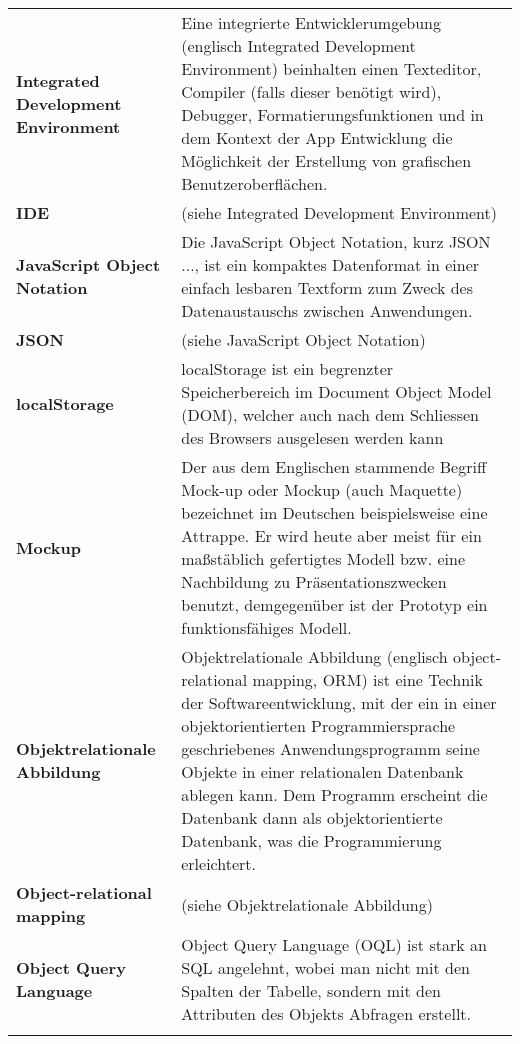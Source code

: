 \begin{longtable}{>{\raggedright}m{3cm}m{11cm}}
	\textbf{Integrated Development Environment}&
	Eine integrierte Entwicklerumgebung (englisch Integrated Development Environment) beinhalten einen Texteditor, Compiler (falls dieser benötigt wird), Debugger, Formatierungsfunktionen und in dem Kontext der App Entwicklung die Möglichkeit der Erstellung von grafischen Benutzeroberflächen.\\ \addlinespace

	\textbf{IDE}&
	(siehe Integrated Development Environment)\\ \addlinespace

	\textbf{JavaScript Object Notation}&
	Die JavaScript Object Notation, kurz JSON ..., ist ein kompaktes Datenformat in einer einfach lesbaren Textform zum Zweck des Datenaustauschs zwischen Anwendungen.\cite{wiki_json}\\ \addlinespace

	\textbf{JSON}&
	(siehe JavaScript Object Notation)\\ \addlinespace

	\textbf{localStorage}&
	localStorage ist ein begrenzter Speicherbereich im Document Object Model (DOM), welcher auch nach dem Schliessen des Browsers ausgelesen werden kann\\ \addlinespace	

	\textbf{Mockup}&
	Der aus dem Englischen stammende Begriff Mock-up oder Mockup (auch Maquette) bezeichnet im Deutschen beispielsweise eine Attrappe. Er wird heute aber meist für ein maßstäblich gefertigtes Modell bzw. eine Nachbildung zu Präsentationszwecken benutzt, demgegenüber ist der Prototyp ein funktionsfähiges Modell.\cite{wiki_mockup}\\ \addlinespace	

	\textbf{Objektrelationale Abbildung}&
	Objektrelationale Abbildung (englisch object-relational mapping, ORM) ist eine Technik der Softwareentwicklung, mit der ein in einer objektorientierten Programmiersprache geschriebenes Anwendungsprogramm seine Objekte in einer relationalen Datenbank ablegen kann. Dem Programm erscheint die Datenbank dann als objektorientierte Datenbank, was die Programmierung erleichtert. \cite{wiki_orm}\\ \addlinespace	

	\textbf{Object-relational mapping}&
	(siehe Objektrelationale Abbildung)\\ \addlinespace	

	\textbf{Object Query Language}&
	Object Query Language (OQL) ist stark an SQL angelehnt, wobei man nicht mit den Spalten der Tabelle, sondern mit den Attributen des Objekts Abfragen erstellt.\\ \addlinespace	


\end{longtable}
